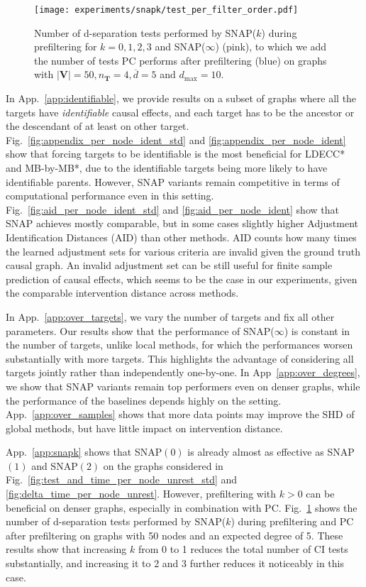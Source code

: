 \begin{figure}
    \centering
    \texttt{[image: experiments/snapk/test\_per\_filter\_order.pdf]}
    \caption{Number of d-separation tests performed by SNAP($k$) during prefiltering for $k=0,1,2,3$ and SNAP($\infty$) (pink), to which we add the number of tests PC performs after prefiltering (blue) on graphs with $|\mathbf{V}| = 50, n_{\mathbf{T}}=4, \overline{d} = 5$ and $d_{\max}=10$.
    }
    \label{fig:test_per_filter_order}
\end{figure}

In App.~\ref{app:identifiable}, we provide results on a subset of graphs where all the targets have \emph{identifiable} causal effects, and each target has to be the ancestor or the descendant of at least on other target.
Fig.~\ref{fig:appendix_per_node_ident_std} and \ref{fig:appendix_per_node_ident} show that forcing targets to be identifiable is the most beneficial for LDECC* and MB-by-MB*, due to the identifiable targets being more likely to have identifiable parents.
However, SNAP variants remain competitive in terms of computational performance even in this setting.
Fig.~\ref{fig:aid_per_node_ident_std} and \ref{fig:aid_per_node_ident} show that SNAP achieves mostly comparable, but in some cases slightly higher Adjustment Identification Distances (AID) than other methods. AID counts how many times the learned adjustment sets for various criteria are invalid given the ground truth causal graph. An invalid adjustment set can be still useful for finite sample prediction of causal effects, which seems to be the case in our experiments, given the comparable intervention distance across methods.


In App.~\ref{app:over_targets}, we vary the number of targets and fix all other parameters.
Our results show that the performance of SNAP($\infty$) is constant in the number of targets, unlike local methods, for which the performances worsen substantially with more targets.
This highlights the advantage of considering all targets jointly rather than independently one-by-one.
In App~\ref{app:over_degrees}, we show that SNAP variants remain top performers even on denser graphs, while the performance of the baselines depends highly on the setting.
App.~\ref{app:over_samples} shows that more data points may improve the \ac{SHD} of global methods, but have little impact on intervention distance.


App.~\ref{app:snapk} shows that SNAP$(0)$ is already almost as effective as SNAP$(1)$ and SNAP$(2)$ on the graphs considered in Fig.~\ref{fig:test_and_time_per_node_unrest_std} and \ref{fig:delta_time_per_node_unrest}.
However, prefiltering with $k > 0$ can be beneficial on denser graphs, especially in combination with PC.
Fig.~\ref{fig:test_per_filter_order} shows the number of d-separation tests performed by SNAP($k$) during prefiltering and PC after prefiltering on graphs with 50 nodes and an expected degree of 5.
These results show that increasing $k$ from 0 to 1 reduces the total number of \ac{CI} tests substantially, and increasing it to 2 and 3 further reduces it noticeably in this case.


